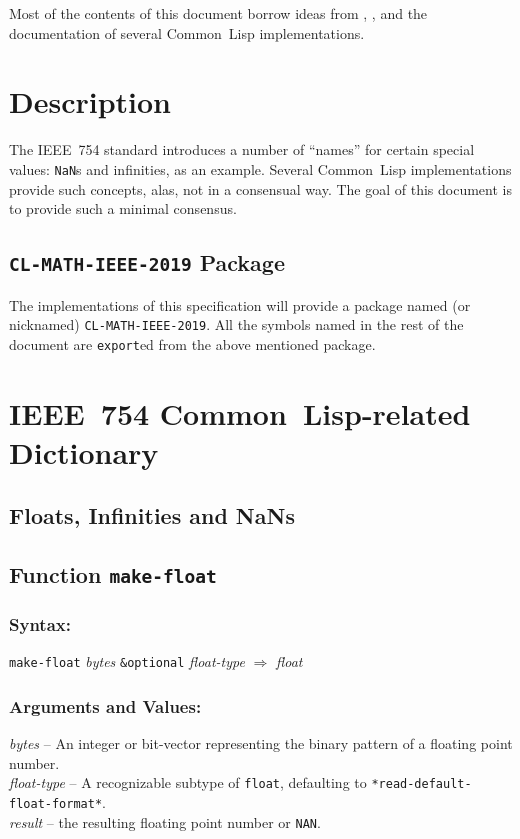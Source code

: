 \documentclass[fleqn]{article}
\newcommand{\CL}{\textsf{Common~Lisp}}
\newcommand{\code}[1]{\texttt{#1}}
\newcommand{\varname}[1]{\textit{#1}}
\newcommand{\DDictionaryItem}[1]{\vspace*{6pt}\noindent\hrulefill\vspace*{-9pt}\subsection*{#1}}
\newcommand{\DSyntax}{\subsubsection*{Syntax:}}
\newcommand{\DArgsNValues}{\subsubsection*{Arguments and Values:}}
\begin{document}
\vspace*{3mm}

Most of the contents of this document borrow ideas from
\cite{IEEE-754}, \cite{C18}, and the documentation of
several \CL{} implementations.



\section{Description}

The IEEE~754 standard introduces a number of ``names'' for certain
special values: \code{NaN}s and infinities, as an example.  Several
\CL{} implementations provide such concepts, alas, not in a consensual
way.  The goal of this document is to provide such a minimal
consensus.

\subsection{\code{CL-MATH-IEEE-2019} Package}

The implementations of this specification will provide a package named
(or nicknamed) \code{CL-MATH-IEEE-2019}.  All the symbols named in the rest
of the document are \code{export}ed from the above mentioned package.




\section{IEEE~754 \CL{}-related Dictionary}

\subsection{Floats, Infinities and NaNs}

\DDictionaryItem{Function \code{make-float}}

\DSyntax{}

\code{make-float} \varname{bytes} \code{\&optional}
\varname{float-type}
$\Rightarrow$ \varname{float}

\DArgsNValues{}

\varname{bytes} -- An integer or bit-vector representing the binary
pattern of a floating point number.\\
\varname{float-type} -- A recognizable subtype of \code{float},
defaulting to \code{*read-default-float-format*}.\\
\varname{result} -- the resulting floating point number or \code{NAN}.
\end{document}
